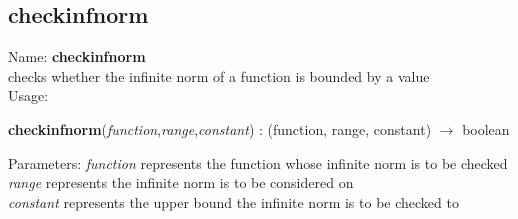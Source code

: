 \subsection{ checkinfnorm }
\noindent Name: \textbf{checkinfnorm}\\
checks whether the infinite norm of a function is bounded by a value\\

\noindent Usage: 
\begin{center}
\textbf{checkinfnorm}(\emph{function},\emph{range},\emph{constant}) : (\textsf{function}, \textsf{range}, \textsf{constant}) $\rightarrow$ \textsf{boolean}\\
\end{center}
Parameters: 
\emph{function} represents the function whose infinite norm is to be checked\\
\emph{range} represents the infinite norm is to be considered on\\
\emph{constant} represents the upper bound the infinite norm is to be checked to\\

